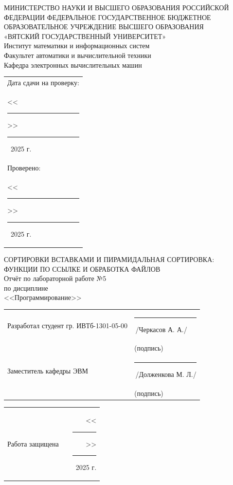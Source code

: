 \documentclass[oneside,a4paper,14pt]{extarticle}
\begin{document}
\newpage
\thispagestyle{empty}
\begin{center}
	МИНИСТЕРСТВО НАУКИ И ВЫСШЕГО ОБРАЗОВАНИЯ РОССИЙСКОЙ ФЕДЕРАЦИИ ФЕДЕРАЛЬНОЕ ГОСУДАРСТВЕННОЕ БЮДЖЕТНОЕ ОБРАЗОВАТЕЛЬНОЕ УЧРЕЖДЕНИЕ ВЫСШЕГО ОБРАЗОВАНИЯ\\
	«ВЯТСКИЙ ГОСУДАРСТВЕННЫЙ УНИВЕРСИТЕТ»\\
	Институт математики и информационных систем\\
	Факультет автоматики и вычислительной техники\\
	Кафедра электронных вычислительных машин
\end{center}
\vspace{10mm}

\hfill
\begin{tabular}{l}
  \footnotesize Дата сдачи на проверку: \\
  \footnotesize <<\rule[-1mm]{5mm}{0.10mm}\/>>\rule[-1mm]{20mm}{0.10mm}\ 2025 г.\\
  \footnotesize Проверено: \\
  \footnotesize <<\rule[-1mm]{5mm}{0.10mm}\/>>\rule[-1mm]{20mm}{0.10mm}\ 2025 г. \\
\end{tabular}
\vfill

\begin{center}
    СОРТИРОВКИ ВСТАВКАМИ И ПИРАМИДАЛЬНАЯ СОРТИРОВКА: ФУНКЦИИ ПО ССЫЛКЕ И ОБРАБОТКА ФАЙЛОВ\\
	Отчёт по лабораторной работе №5\\
	по дисциплине\\
	<<Программирование>>\\
\end{center}
\vspace{25mm}
\noindent
\begin{tabular}{ll}
	Разработал студент гр. ИВТб-1301-05-00 & \rule[-1mm]{30mm}{0.10mm}\,/Черкасов А. А./   \\
	                                       & \hspace{8mm}\footnotesize(подпись)            \\
	Заместитель кафедры ЭВМ                & \rule[-1mm]{30mm}{0.10mm}\,/Долженкова М. Л./ \\
	                                       & \hspace{8mm}\footnotesize(подпись)            \\
\end{tabular}

\noindent
  \begin{tabular}{lp{58mm}r}
    Работа защищена &  & <<\rule[-1mm]{5mm}{0.10mm}\/>>\rule[-1mm]{30mm}{0.10mm}\ 2025 г.
  \end{tabular}
  \vfill
\end{document}
